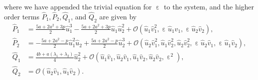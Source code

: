 \documentclass[10pt,onecolumn]{article}
\theoremstyle{plain}
\DeclareMathOperator{\eps}{\varepsilon}
\begin{document}
%
where we have appended the trivial equation for $\eps$ to the system, and the higher order terms $\hat P_1, \hat P_2, \hat Q_1$, and $\hat Q_2$ are given by
%
\begin{equation*}
  \begin{split}
    \hat P_1 &= \tfrac{5a+2a^2+3p}{2} \hat u_1^3 - \tfrac{5a+2a^2+3p}{2} \hat u_1 \hat u_2^2 + \mathcal O \left( \hat u_1 \hat v_1^2, \eps \hat u_1 \hat v_1,\eps \hat u_2 \hat v_2 \right), \\ 
    \hat P_2 &= -\tfrac{5a+2a^2-p}{2} \hat u_1^2 \hat u_2+\tfrac{5a+2a^2-p}{2}\hat u_2^3 + \mathcal O \left( \hat u_2 \hat v_1^2,\hat u_1\hat v_2^2,\hat u_2 \hat v_2^2,\eps \hat u_2 \hat v_1,\eps \hat u_1 \hat v_2 \right),  \\
    \hat Q_1 &= \tfrac{4b+a(\lambda_1+\lambda_2)}{4} \hat u_2^2 + \mathcal O \left( \hat u_1 \hat v_1,\hat u_2 \hat v_1, \hat u_1 \hat v_2, \hat u_2 \hat v_2, \eps^2 \right),  \\ 
    \hat Q_2 &= \mathcal O \left( \hat u_2 \hat v_1,\hat u_1 \hat v_2 \right).
  \end{split}
\end{equation*}
%

\medskip
\end{document}
